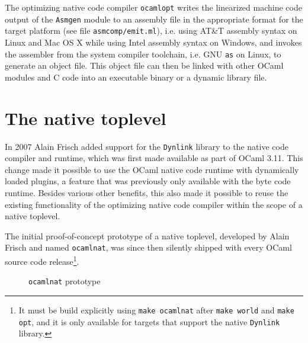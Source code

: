 \documentclass[10pt,a4paper,final,twocolumn]{article}
\makeatletter
\newcommand{\ie}{i.e.\@\xspace}
\makeatother
\begin{document}
The optimizing native code compiler \texttt{ocamlopt} writes the linearized machine code output of the
\texttt{Asmgen} module to an assembly file in the appropriate format for the target platform (see file
\texttt{asmcomp/emit.ml}), \ie using AT\&T assembly syntax on Linux and Mac OS X while using Intel assembly
syntax on Windows, and invokes the assembler from the system compiler toolchain, \ie GNU \texttt{as} on Linux,
to generate an object file. This object file can then be linked with other OCaml modules and C code into
an executable binary or a dynamic library file.


\section{The native toplevel} \label{section:The_native_toplevel}

In 2007 Alain Frisch added support for the \texttt{Dynlink} library to the native code compiler and
runtime, which was first made available as part of OCaml 3.11. This change made it possible to use
the OCaml native code runtime with dynamically loaded plugins, a feature that was previously only
available with the byte code runtime. Besides various other benefits, this also made it possible
to reuse the existing functionality of the optimizing native code compiler within the scope of a
native toplevel.

The initial proof-of-concept prototype of a native toplevel, developed by Alain Frisch and named
\texttt{ocamlnat}, was since then silently shipped with every OCaml source code release\footnote{It
must be build explicitly using \texttt{make ocamlnat} after \texttt{make world} and \texttt{make opt},
and it is only available for targets that support the native \texttt{Dynlink} library.}.

\begin{figure}[htb]
  \centering
  \caption{\texttt{ocamlnat} prototype}
  \label{fig:ocamlnat_prototype}
\end{figure}
\end{document}
